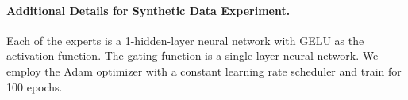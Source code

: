 \begin{figure}[t]
\end{figure}

\begin{figure}[t]
\end{figure}

\paragraph{Additional Details for Synthetic Data Experiment.}
Each of the experts is a 1-hidden-layer neural network with GELU as the activation function. The gating function is a single-layer neural network. We employ the Adam optimizer with a constant learning rate scheduler and train for 100 epochs.

